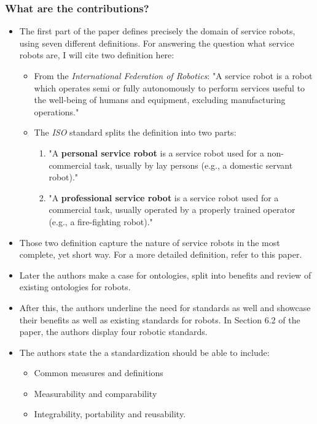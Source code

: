     \subsubsection*{What are the contributions?}
    \begin{itemize}
        \item The first part of the paper defines precisely the domain of service robots, using seven different definitions. For answering the question what service robots are, I will cite two definition here: \ \begin{itemize}
            \item From the \emph{International Federation of Robotics}: "A service robot is a robot which operates semi or
            fully autonomously to perform services useful to the well-being of
            humans and equipment, excluding manufacturing operations." 
            \item The \emph{ISO} standard splits the definition into two parts: \ \begin{enumerate}
                \item "A \textbf{personal service robot} is a service robot used for
                a non-commercial task, usually by lay persons (e.g., a domestic
                servant robot)."
                \item "A \textbf{professional service robot} is a service robot used
                for a commercial task, usually operated by a properly trained
                operator (e.g., a fire-fighting robot)."            
            \end{enumerate}
        \end{itemize}  
        \item Those two definition capture the nature of service robots in the most complete, yet short way. For a more detailed definition, refer to this paper.
        \item Later the authors make a case for ontologies, split into benefits and review of existing ontologies for robots. 
        \item After this, the authors underline the need for standards as well and showcase their benefits as well as existing standards for robots. In Section 6.2 of the paper, the authors display four robotic standards. 
        \item The authors state the a standardization should be able to include: \ \begin{itemize}
            \item Common measures and definitions
            \item Measurability and comparability 
            \item Integrability, portability and reusability.
        \end{itemize}
    \end{itemize}

